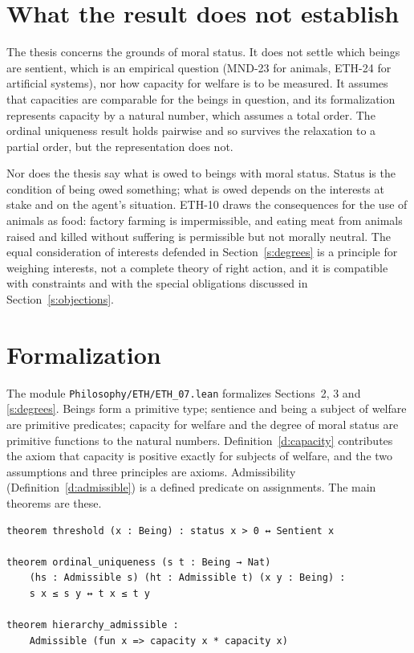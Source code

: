 \documentclass{situationist-preprint}
\begin{document}
\section{What the result does not establish}\label{s:limits}

The thesis concerns the grounds of moral status. It does not settle which beings are sentient, which is an empirical question (MND-23 for animals, ETH-24 for artificial systems), nor how capacity for welfare is to be measured. It assumes that capacities are comparable for the beings in question, and its formalization represents capacity by a natural number, which assumes a total order. The ordinal uniqueness result holds pairwise and so survives the relaxation to a partial order, but the representation does not.

Nor does the thesis say what is owed to beings with moral status. Status is the condition of being owed something; what is owed depends on the interests at stake and on the agent's situation. ETH-10 draws the consequences for the use of animals as food: factory farming is impermissible, and eating meat from animals raised and killed without suffering is permissible but not morally neutral. The equal consideration of interests defended in Section~\ref{s:degrees} is a principle for weighing interests, not a complete theory of right action, and it is compatible with constraints and with the special obligations discussed in Section~\ref{s:objections}.

\section{Formalization}\label{s:formal}

The module \nolinkurl{Philosophy/ETH/ETH_07.lean} formalizes Sections~2, 3 and \ref{s:degrees}. Beings form a primitive type; sentience and being a subject of welfare are primitive predicates; capacity for welfare and the degree of moral status are primitive functions to the natural numbers. Definition~\ref{d:capacity} contributes the axiom that capacity is positive exactly for subjects of welfare, and the two assumptions and three principles are axioms. Admissibility (Definition~\ref{d:admissible}) is a defined predicate on assignments. The main theorems are these.

\begin{lstlisting}
theorem threshold (x : Being) : status x > 0 ↔ Sentient x

theorem ordinal_uniqueness (s t : Being → Nat)
    (hs : Admissible s) (ht : Admissible t) (x y : Being) :
    s x ≤ s y ↔ t x ≤ t y

theorem hierarchy_admissible :
    Admissible (fun x => capacity x * capacity x)
\end{lstlisting}
\end{document}
